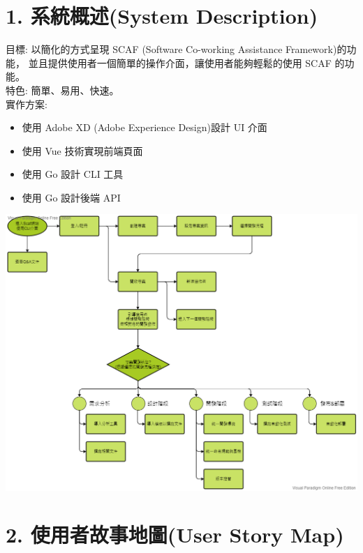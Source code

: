 \documentclass{report}
\begin{document}
\section*{1. 系統概述(System Description)}
目標: 以簡化的方式呈現 SCAF (Software Co-working Assistance Framework)的功能，
並且提供使用者一個簡單的操作介面，讓使用者能夠輕鬆的使用 SCAF 的功能。\\
特色: 簡單、易用、快速。\\
實作方案:
  \begin{itemize}
    \item 使用 Adobe XD (Adobe Experience Design)設計 UI 介面
    \item 使用 Vue 技術實現前端頁面
    \item 使用 Go 設計 CLI 工具
    \item 使用 Go 設計後端 API
  \end{itemize}
\includegraphics[width=\textwidth]{assets/system.png}

\section*{2. 使用者故事地圖(User Story Map)}

\end{document}

